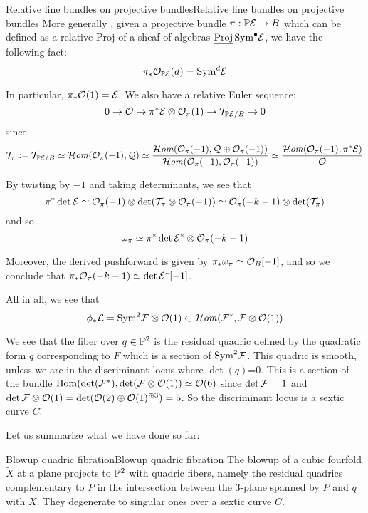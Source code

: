 \begin{remark}{Relative line bundles on projective bundles}{Relative line bundles on projective bundles}
    More generally \cite[Remark~13.36]{Wedhorn}, given a projective bundle $\pi:\P\calE \rightarrow B$ which can be defined as a relative Proj of a sheaf of algebras $\underline{\Proj}\, \mathrm{Sym}^\bullet \calE$, we have the following fact: $$\pi_* \O_{\P\calE}(d)=\mathrm{Sym}^d \calE$$ 

    In particular, $\pi_*\O(1)=\calE$. We also have a relative Euler sequence: $$0\rightarrow \O\rightarrow \pi^* \calE \otimes \O_{\pi}(1)\rightarrow \calT_{\P\calE/B}\rightarrow 0$$since $$\calT_\pi:=\calT_{\P\calE/B}\simeq \lHom(\O_{\pi}(-1),\mathcal{Q})\simeq \frac{\lHom(\O_{\pi}(-1),\mathcal{Q}\oplus \O_{\pi}(-1))}{\lHom (\O_{\pi}(-1), \O_{\pi}(-1))}\simeq \frac{\lHom(\O_{\pi}(-1), \pi^* \calE)}{ \O}$$  

    By twisting by $-1$ and taking determinants, we see that $$\pi^* \det \calE \simeq \O_\pi(-1) \otimes \det(\calT_\pi\otimes \O_\pi(-1))\simeq \O_\pi(-k-1) \otimes \det(\calT_\pi)$$and so $$\omega_\pi\simeq \pi^* \det \calE^* \otimes \O_{\pi}(-k-1)$$

    Moreover, the derived pushforward is given by $\pi_* \omega_\pi\simeq \O_B[-1]$, and so we conclude that $\pi_* \O_\pi(-k-1) \simeq \det \calE^*[-1]$. 
 \end{remark}

All in all, we see that $$\phi_* \calL = \mathrm{Sym}^2 \calF \otimes \O(1)\subset\lHom (\calF^* , \calF \otimes \O(1))$$

We see that the fiber over $q \in \P^2$ is the residual quadric defined by the quadratic form $q$ corresponding to $F$ which is a section of $\mathrm{Sym}^2\calF$. This quadric is smooth, unless we are in the discriminant locus where $\det(q)$=0. This is a section of the bundle $\Hom(\det(\calF^*), \det (\calF\otimes \O(1))\simeq \O(6) $ since $\det \calF=1$ and $\det \calF\otimes \O(1)= \det (\O(2) \oplus \O(1)^{\oplus 3})=5$. So the discriminant locus is a sextic curve $C$!

Let us summarize what we have done so far:

\begin{proposition}{Blowup quadric fibration}{Blowup quadric fibration}
    The blowup of a cubic fourfold $\tilde{X}$ at a plane projects to $\P^2$ with quadric fibers, namely the residual quadrics complementary to $P$ in the intersection between the 3-plane spanned by $P$ and $q$ with $X$. They degenerate to singular ones over a sextic curve $C$.
\end{proposition}


